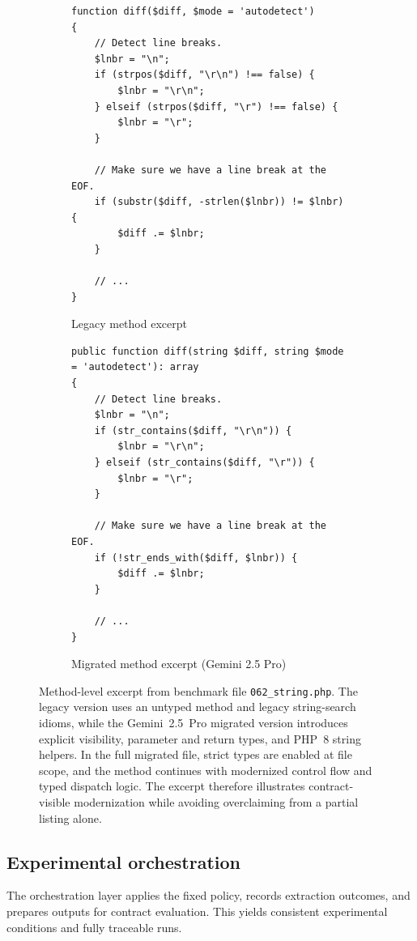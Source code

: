 \begin{figure}[t]
\centering
\begin{subfigure}[t]{0.48\textwidth}
\centering
\caption{Legacy method excerpt}
\label{fig:framework_case_study_before}
\begin{Verbatim}[fontsize=\scriptsize,frame=single,rulecolor=\color{hdrBlue},bgcolor=rowA,framesep=3mm,breaklines=true,breakanywhere=true]
function diff($diff, $mode = 'autodetect')
{
    // Detect line breaks.
    $lnbr = "\n";
    if (strpos($diff, "\r\n") !== false) {
        $lnbr = "\r\n";
    } elseif (strpos($diff, "\r") !== false) {
        $lnbr = "\r";
    }

    // Make sure we have a line break at the EOF.
    if (substr($diff, -strlen($lnbr)) != $lnbr) {
        $diff .= $lnbr;
    }

    // ...
}
\end{Verbatim}
\end{subfigure}
\hfill
\begin{subfigure}[t]{0.48\textwidth}
\centering
\caption{Migrated method excerpt (Gemini 2.5 Pro)}
\label{fig:framework_case_study_after}
\begin{Verbatim}[fontsize=\scriptsize,frame=single,rulecolor=\color{sepLine},bgcolor=rowB,framesep=3mm,breaklines=true,breakanywhere=true]
public function diff(string $diff, string $mode = 'autodetect'): array
{
    // Detect line breaks.
    $lnbr = "\n";
    if (str_contains($diff, "\r\n")) {
        $lnbr = "\r\n";
    } elseif (str_contains($diff, "\r")) {
        $lnbr = "\r";
    }

    // Make sure we have a line break at the EOF.
    if (!str_ends_with($diff, $lnbr)) {
        $diff .= $lnbr;
    }

    // ...
}
\end{Verbatim}
\end{subfigure}
\caption{Method-level excerpt from benchmark file \texttt{062\_string.php}. The legacy version uses an untyped method and legacy string-search idioms, while the Gemini~2.5~Pro migrated version introduces explicit visibility, parameter and return types, and PHP~8 string helpers. In the full migrated file, strict types are enabled at file scope, and the method continues with modernized control flow and typed dispatch logic. The excerpt therefore illustrates contract-visible modernization while avoiding overclaiming from a partial listing alone.}
\label{fig:framework_case_study}
\end{figure}

\subsection{Experimental orchestration}
\label{sec:framework_orchestration}

The orchestration layer applies the fixed policy, records extraction outcomes, and prepares outputs for contract evaluation.
This yields consistent experimental conditions and fully traceable runs.

